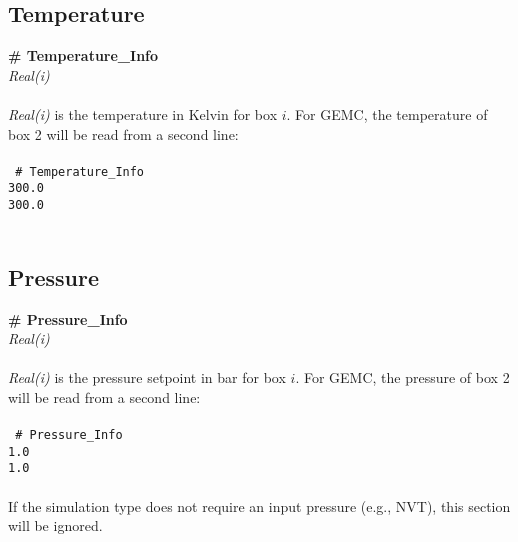 \subsection{Temperature}\label{sec:Temperature_Info}
{\bf \# Temperature\_Info} \\ 
{\it Real(i)} \\ \\
%
{\it Real(i)} is the temperature in Kelvin for box $i$. 
For GEMC, the temperature of box 2 will be read from a second line: \\ \\
%
\texttt{
\# Temperature\_Info \\
 300.0 \\
 300.0} \\ \\
%
%
%
\subsection{Pressure}\label{sec:Pressure_Info}
{\bf \# Pressure\_Info} \\
{\it Real(i)} \\ \\
%
{\it Real(i)} is the pressure setpoint in bar for box $i$.
For GEMC, the pressure of box 2 will be read from a second line: \\ \\
%
\texttt{
\# Pressure\_Info \\
 1.0 \\
 1.0} \\ \\
%
If the simulation type does not require an input pressure (e.g., NVT), this section will be ignored.  
%
%
